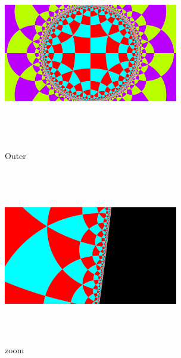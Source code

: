 \begin{figure}[htbp]
  \begin{minipage}{0.49\hsize}
   \center
   \includegraphics[width=3in, height=3in, keepaspectratio]{../img/tessellation/outer.pdf}
   \caption{Outer}
   \label{fig:outer}
  \end{minipage}
 \hspace*{\fill}
 \begin{minipage}{0.49\hsize}
  \center
  \includegraphics[width=3in, height=3in, keepaspectratio]{../img/tessellation/zoom.pdf}
  \caption{zoom}
  \label{fig:zoom}
 \end{minipage}
\end{figure}


